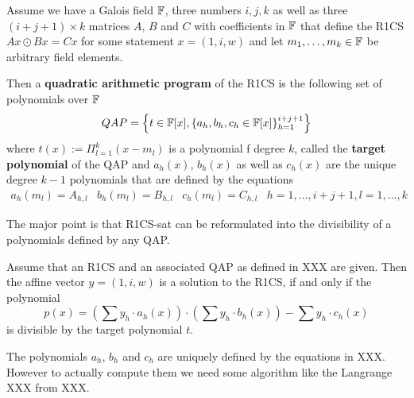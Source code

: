 \begin{definition}
Assume we have a Galois field $\mathbb{F}$, three numbers $i,j,k$ as well as three $(i+j+1) \times k$ matrices $A$, $B$ and $C$  with coefficients in $\mathbb{F}$ that define the R1CS
$Ax \odot Bx = Cx $ for some statement $x=(1,i,w)$ and let $m_1,\ldots,m_k\in \mathbb{F}$ be arbitrary field elements. 

Then a \textbf{quadratic arithmetic program} of the R1CS is the following set of polynomials over $\mathbb{F}$
$$
QAP = \left\{t\in \mathbb{F}[x],\left\{a_h,b_h,c_h\in \mathbb{F}[x]\right\}_{h=1}^{i+j+1}\right\}
$$
where $t(x) := \Pi_{l=1}^k (x- m_l)$ is a polynomial f degree $k$, called the \textbf{target polynomial} of the QAP and $a_h(x)$, $b_h(x)$ as well as $c_h(x)$ are the unique degree $k-1$ polynomials that are defined by the equations
$$
\begin{array}{lllr}
a_h(m_l)=A_{h,l} & b_h(m_l)=B_{h,l} & c_h(m_l)=C_{h,l} & h= 1, \ldots , i+j+1, l=1,\ldots,k 
\end{array}
$$  
\end{definition}
The major point is that R1CS-sat can be reformulated into the divisibility of a polynomials defined by any QAP.
\begin{theorem}
Assume that an R1CS and an associated QAP as defined in XXX are given. Then the affine vector $y=(1,i,w)$ is a solution to the R1CS, if and only if the polynomial
$$
p(x) = \left(\sum y_h\cdot a_h(x)\right)\cdot \left(\sum y_h\cdot b_h(x)\right)  - \sum y_h\cdot c_h(x) 
$$
is divisible by the target polynomial $t$.
\end{theorem}

The polynomials $a_h$, $b_h$ and $c_h$ are uniquely defined by the equations in XXX. However to actually compute them we need some algorithm like the Langrange XXX from XXX.

